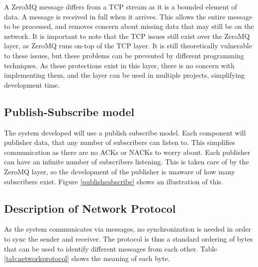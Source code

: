 A ZeroMQ message differs from a TCP stream as it is a bounded element of data. A message is received in full when it arrives. This allows the entire message to be processed, and removes concern about missing data that may still be on the network.  It is important to note that the TCP issues still exist over the ZeroMQ layer, as ZeroMQ runs on-top of the TCP layer. It is still theoretically vulnerable to these issues, but these problems can be prevented by different programming techniques. As these protections exist in this layer, there is no concern with implementing them, and the layer can be used in multiple projects, simplifying development time.

\subsection{Publish-Subscribe model}

The system developed will use a publish subscribe model. Each component will publisher data, that any number of subscribers can listen to. This simplifies communication as there are no ACKs or NACKs to worry about. Each publisher can have an infinite number of subscribers listening. This is taken care of by the ZeroMQ layer, so the development of the publisher is unaware of how many subscribers exist. Figure \ref{publishsubscribe} shows an illustration of this.


\subsection{Description of Network Protocol}

As the system communicates via messages, no synchronization is needed in order to sync the sender and receiver. The protocol is thus a standard ordering of bytes that can be used to identify different messages from each other. Table \ref{tab:networkprotocol} shows the meaning of each byte.

